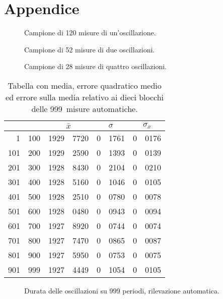 \documentclass[italian,a4paper,10pt]{article}
\theoremstyle{definition}
\begin{document}
\section{Appendice}
   \begin {figure}[hp]\caption{Campione di 120 misure di un'oscillazione.}\label{gr1}
      \begin{center}
        
      \end{center}
    \end {figure}
      \begin {figure}[hp]\caption{Campione di 52 misure di due oscillazioni.}\label{gr2}
      \begin{center}
        
      \end{center}
    \end {figure}
         \begin {figure}[hp]\caption{Campione di 28 misure di quattro oscillazioni.}\label{gr4}
      \begin{center}
        
      \end{center}
    \end {figure}
    \begin{table}[p]\caption{Tabella con media, errore quadratico medio ed errore sulla media relativo ai dieci blocchi delle 999~misure automatiche.}\label{blocchi}
\centering
 \begin{tabular}{r@{--}l r@{.}l r@{.}l r@{.}l}
 \multicolumn{2}{c}{} &
\multicolumn{2}{c}{$\bar{x}$} &
\multicolumn{2}{c}{$\sigma$} &
\multicolumn{2}{c}{$\sigma_{\bar{x}}$} \\
 \hline
 1&100		&1929&7720	&0&1761	&0&0176\\
 101&200	&1929&2590	&0&1393	&0&0139\\
 201&300	&1928&8430	&0&2104	&0&0210\\
 301&400	&1928&5160	&0&1046	&0&0105\\
 401&500	&1928&2510	&0&0780	&0&0078\\
 501&600	&1928&0480	&0&0943	&0&0094\\
 601&700	&1927&8920	&0&0744	&0&0074\\
 701&800	&1927&7470	&0&0865	&0&0087\\
 801&900	&1927&5950	&0&0753	&0&0075\\
 901&999	&1927&4449	&0&1054	&0&0105\\
 \end{tabular}
\end{table}
       \begin {figure}[p]\caption{Durata delle oscillazioni su 999 periodi, rilevazione automatica.}\label{gr1000}
      \begin{center}
        
      \end{center}
    \end {figure}
\end{document}
